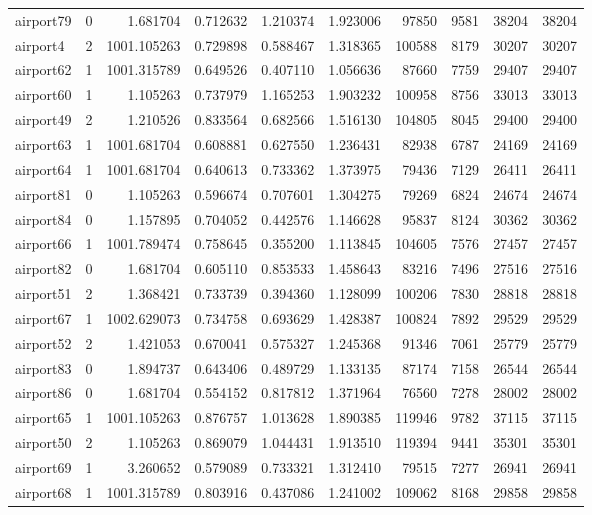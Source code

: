 \documentclass[../../../thesis.tex]{subfiles}
\begin{document}
\begin{longtable}{|l|r|r|r|r|r|r|r|r|r|}
airport79 & 0 & 1.681704 & 0.712632 & 1.210374 & 1.923006 & 97850 & 9581 & 38204 & 38204 \\
airport4 & 2 & 1001.105263 & 0.729898 & 0.588467 & 1.318365 & 100588 & 8179 & 30207 & 30207 \\
airport62 & 1 & 1001.315789 & 0.649526 & 0.407110 & 1.056636 & 87660 & 7759 & 29407 & 29407 \\
airport60 & 1 & 1.105263 & 0.737979 & 1.165253 & 1.903232 & 100958 & 8756 & 33013 & 33013 \\
airport49 & 2 & 1.210526 & 0.833564 & 0.682566 & 1.516130 & 104805 & 8045 & 29400 & 29400 \\
airport63 & 1 & 1001.681704 & 0.608881 & 0.627550 & 1.236431 & 82938 & 6787 & 24169 & 24169 \\
airport64 & 1 & 1001.681704 & 0.640613 & 0.733362 & 1.373975 & 79436 & 7129 & 26411 & 26411 \\
airport81 & 0 & 1.105263 & 0.596674 & 0.707601 & 1.304275 & 79269 & 6824 & 24674 & 24674 \\
airport84 & 0 & 1.157895 & 0.704052 & 0.442576 & 1.146628 & 95837 & 8124 & 30362 & 30362 \\
airport66 & 1 & 1001.789474 & 0.758645 & 0.355200 & 1.113845 & 104605 & 7576 & 27457 & 27457 \\
airport82 & 0 & 1.681704 & 0.605110 & 0.853533 & 1.458643 & 83216 & 7496 & 27516 & 27516 \\
airport51 & 2 & 1.368421 & 0.733739 & 0.394360 & 1.128099 & 100206 & 7830 & 28818 & 28818 \\
airport67 & 1 & 1002.629073 & 0.734758 & 0.693629 & 1.428387 & 100824 & 7892 & 29529 & 29529 \\
airport52 & 2 & 1.421053 & 0.670041 & 0.575327 & 1.245368 & 91346 & 7061 & 25779 & 25779 \\
airport83 & 0 & 1.894737 & 0.643406 & 0.489729 & 1.133135 & 87174 & 7158 & 26544 & 26544 \\
airport86 & 0 & 1.681704 & 0.554152 & 0.817812 & 1.371964 & 76560 & 7278 & 28002 & 28002 \\
airport65 & 1 & 1001.105263 & 0.876757 & 1.013628 & 1.890385 & 119946 & 9782 & 37115 & 37115 \\
airport50 & 2 & 1.105263 & 0.869079 & 1.044431 & 1.913510 & 119394 & 9441 & 35301 & 35301 \\
airport69 & 1 & 3.260652 & 0.579089 & 0.733321 & 1.312410 & 79515 & 7277 & 26941 & 26941 \\
airport68 & 1 & 1001.315789 & 0.803916 & 0.437086 & 1.241002 & 109062 & 8168 & 29858 & 29858 \\

\end{longtable}
\end{document}
